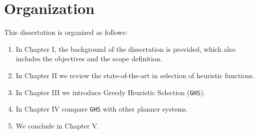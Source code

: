 \section{Organization}
\noindent
This dissertation is organized as follows: 
\begin{enumerate}
\item In Chapter I, the background of the dissertation is provided, which also includes the objectives and the scope definition.
\item In Chapter II we review the state-of-the-art in selection of heuristic functions.
\item In Chapter III we introduce Greedy Heuristic Selection (\texttt{GHS}). 
\item In Chapter IV compare \texttt{GHS} with other planner systems.
\item We conclude in Chapter V.
\end{enumerate}
